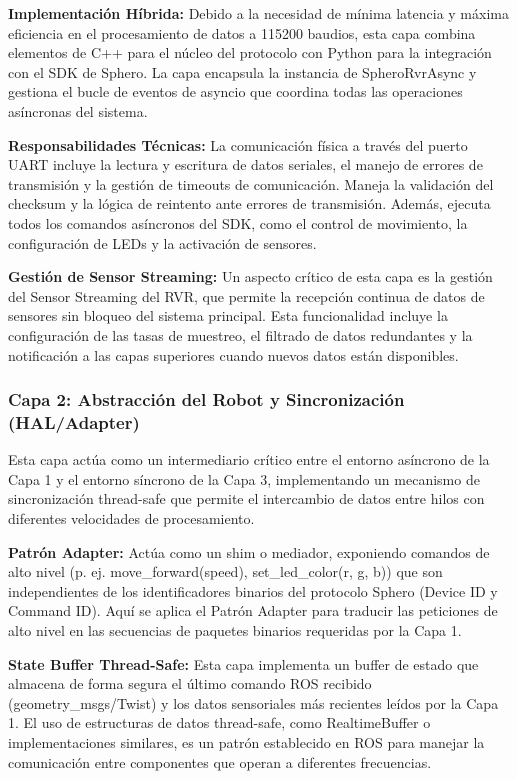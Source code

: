 \documentclass[11pt]{article}
\newcommand{\code}[1]{\textcolor{codeblue}{\url{#1}}}
\numberwithin{figure}{section}
\numberwithin{table}{section}
\def\code#1{#1}%
\begin{document}
\textbf{Implementación Híbrida:} Debido a la necesidad de mínima latencia y máxima eficiencia en el procesamiento de datos a 115200 baudios, esta capa combina elementos de C++ para el núcleo del protocolo con Python para la integración con el SDK de Sphero. La capa encapsula la instancia de SpheroRvrAsync y gestiona el bucle de eventos de asyncio que coordina todas las operaciones asíncronas del sistema.

\textbf{Responsabilidades Técnicas:} La comunicación física a través del puerto UART incluye la lectura y escritura de datos seriales, el manejo de errores de transmisión y la gestión de timeouts de comunicación. Maneja la validación del checksum y la lógica de reintento ante errores de transmisión. Además, ejecuta todos los comandos asíncronos del SDK, como el control de movimiento, la configuración de LEDs y la activación de sensores.

\textbf{Gestión de Sensor Streaming:} Un aspecto crítico de esta capa es la gestión del Sensor Streaming del RVR, que permite la recepción continua de datos de sensores sin bloqueo del sistema principal. Esta funcionalidad incluye la configuración de las tasas de muestreo, el filtrado de datos redundantes y la notificación a las capas superiores cuando nuevos datos están disponibles.


\subsubsection{Capa 2: Abstracción del Robot y Sincronización (HAL/Adapter)}

Esta capa actúa como un intermediario crítico entre el entorno asíncrono de la Capa 1 y el entorno síncrono de la Capa 3, implementando un mecanismo de sincronización thread-safe que permite el intercambio de datos entre hilos con diferentes velocidades de procesamiento.

\textbf{Patrón Adapter:} Actúa como un shim o mediador, exponiendo comandos de alto nivel (p. ej. \code{move\_forward(speed)}, \code{set\_led\_color(r, g, b)}) que son independientes de los identificadores binarios del protocolo Sphero (Device ID y Command ID). Aquí se aplica el Patrón Adapter para traducir las peticiones de alto nivel en las secuencias de paquetes binarios requeridas por la Capa 1.

\textbf{State Buffer Thread-Safe:} Esta capa implementa un buffer de estado que almacena de forma segura el último comando ROS recibido (\code{geometry\_msgs/Twist}) y los datos sensoriales más recientes leídos por la Capa 1. El uso de estructuras de datos thread-safe, como RealtimeBuffer o implementaciones similares, es un patrón establecido en ROS para manejar la comunicación entre componentes que operan a diferentes frecuencias.
\end{document}
